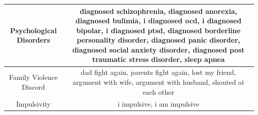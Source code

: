 \documentclass[11pt]{article}
\begin{document}
\begin{table}
\begin{tabulary}{500pt}{|C|C|}
   Psychological Disorders               & diagnosed schizophrenia, diagnosed anorexia, diagnosed bulimia, i diagnosed ocd, i diagnosed bipolar, i diagnosed ptsd, diagnosed borderline personality disorder, diagnosed panic disorder, diagnosed social anxiety disorder, diagnosed post traumatic stress disorder, sleep apnea                                                                                                                                                                                                                                                                                                                                                                                                                                                                                                                                                     \\ \hline
   Family Violence Discord               & dad fight again, parents fight again, lost my friend, argument with wife, argument with husband, shouted at each other                                                                                                                                                                                                                                                                                                                                                                                                                                                                                                                                                                                                                                                                                                                    \\ \hline
   Impulsivity                           & i impulsive, i am impulsive                                                                                                                                                                                                                                                                                                                                                                                                                                                                                                                                                                                                                                                                                                                                                                                                               \\ \hline

\end{tabulary}
\end{table}
\end{document}
